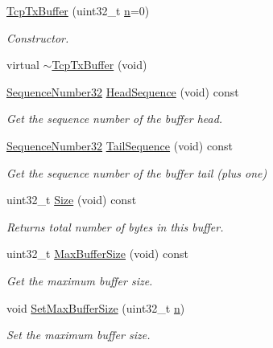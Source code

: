 \begin{DoxyCompactItemize}
\item 
\hyperlink{classns3_1_1TcpTxBuffer_afdb96487c75ba8447e475d0489ded790}{Tcp\+Tx\+Buffer} (uint32\+\_\+t \hyperlink{lte__link__budget__x2__handover__measures_8m_abdb05bc5a064cf642a06c83b3392f148}{n}=0)
\begin{DoxyCompactList}\small\item\em Constructor. \end{DoxyCompactList}\item 
virtual \hyperlink{classns3_1_1TcpTxBuffer_a6175cedf45be31fdf72c0a2e16e804f5}{$\sim$\+Tcp\+Tx\+Buffer} (void)
\item 
\hyperlink{group__network_gacb2070e4e98d2d5135c9bede58f07a03}{Sequence\+Number32} \hyperlink{classns3_1_1TcpTxBuffer_a6c7cdcf53b722f2877372bd75a1541a7}{Head\+Sequence} (void) const 
\begin{DoxyCompactList}\small\item\em Get the sequence number of the buffer head. \end{DoxyCompactList}\item 
\hyperlink{group__network_gacb2070e4e98d2d5135c9bede58f07a03}{Sequence\+Number32} \hyperlink{classns3_1_1TcpTxBuffer_a1c2dbb57cd4581054e57ee8ae0cbfb06}{Tail\+Sequence} (void) const 
\begin{DoxyCompactList}\small\item\em Get the sequence number of the buffer tail (plus one) \end{DoxyCompactList}\item 
uint32\+\_\+t \hyperlink{classns3_1_1TcpTxBuffer_a24621b9d6f583bbbe4567b239901176b}{Size} (void) const 
\begin{DoxyCompactList}\small\item\em Returns total number of bytes in this buffer. \end{DoxyCompactList}\item 
uint32\+\_\+t \hyperlink{classns3_1_1TcpTxBuffer_ac31145a6c4f814d5ddb95ab1c3bce972}{Max\+Buffer\+Size} (void) const 
\begin{DoxyCompactList}\small\item\em Get the maximum buffer size. \end{DoxyCompactList}\item 
void \hyperlink{classns3_1_1TcpTxBuffer_acfcca2382edeeefb01f39369585b5d6b}{Set\+Max\+Buffer\+Size} (uint32\+\_\+t \hyperlink{lte__link__budget__x2__handover__measures_8m_abdb05bc5a064cf642a06c83b3392f148}{n})
\begin{DoxyCompactList}\small\item\em Set the maximum buffer size. \end{DoxyCompactList}\item 

\end{DoxyCompactItemize}
